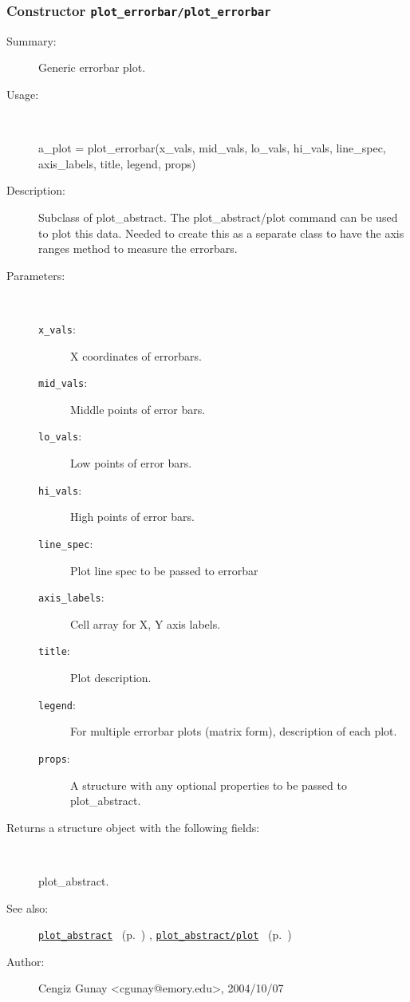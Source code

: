 \subsubsection[Constructor \texttt{plot\_errorbar}]{Constructor \texttt{plot\_errorbar/plot\_errorbar}}%
%
\label{ref_plot_errorbar__plot_errorbar}%
\hypertarget{ref_plot_errorbar__plot_errorbar}{}%
\begin{description}
\item[Summary:]Generic errorbar plot.
%
\item[Usage:]~%
\begin{lyxcode}%
a\_plot = plot\_errorbar(x\_vals, mid\_vals, lo\_vals, hi\_vals, line\_spec, 
			 axis\_labels, title, legend, props)
%
\end{lyxcode}%
%
\item[Description:]%
Subclass of plot\_abstract. The plot\_abstract/plot command can be used to
 plot this data. Needed to create this as a separate class to have the
 axis ranges method to measure the errorbars.
\item[Parameters:]~
\begin{description}%
\item[\texttt{x\_vals}:]
 X coordinates of errorbars.
\item[\texttt{mid\_vals}:]
 Middle points of error bars.
\item[\texttt{lo\_vals}:]
 Low points of error bars.
\item[\texttt{hi\_vals}:]
 High points of error bars.
\item[\texttt{line\_spec}:]
 Plot line spec to be passed to errorbar
\item[\texttt{axis\_labels}:]
 Cell array for X, Y axis labels.
\item[\texttt{title}:]
 Plot description.
\item[\texttt{legend}:]
 For multiple errorbar plots (matrix form), description of each plot.
\item[\texttt{props}:]
 A structure with any optional properties to be passed to plot\_abstract.
\end{description}%
%
\item[Returns a structure object with the following fields:]~

	plot\_abstract.
%
%
\item[See also:]%
\hyperlink{ref_plot_abstract}{\texttt{plot\_abstract}}%
\ (p.~\pageref{ref_plot_abstract})%
%
, \hyperlink{ref_plot_abstract__plot}{\texttt{plot\_abstract/plot}}%
\ (p.~\pageref{ref_plot_abstract__plot})%
%
%
\item[Author:]%
Cengiz Gunay <cgunay@emory.edu>, 2004/10/07%
\end{description}
\methodline%
